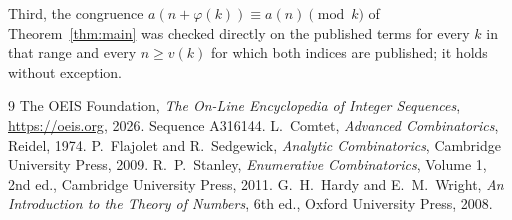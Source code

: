\documentclass[11pt,a4paper]{article}
\theoremstyle{plain}
\theoremstyle{definition}
\begin{document}
Third, the congruence $a(n+\varphi(k))\equiv a(n)\pmod k$ of Theorem~\ref{thm:main} was
checked directly on the published terms for every $k$ in that range and every $n\ge v(k)$
for which both indices are published; it holds without exception.

\begin{thebibliography}{9}
 The OEIS Foundation, \emph{The On-Line Encyclopedia of Integer
Sequences}, \url{https://oeis.org}, 2026. Sequence A316144.
 L.~Comtet, \emph{Advanced Combinatorics}, Reidel, 1974.
 P.~Flajolet and R.~Sedgewick, \emph{Analytic Combinatorics}, Cambridge
University Press, 2009.
 R.~P.~Stanley, \emph{Enumerative Combinatorics}, Volume 1, 2nd ed.,
Cambridge University Press, 2011.
 G.~H.~Hardy and E.~M.~Wright, \emph{An Introduction to the Theory of
Numbers}, 6th ed., Oxford University Press, 2008.
\end{thebibliography}
\end{document}
